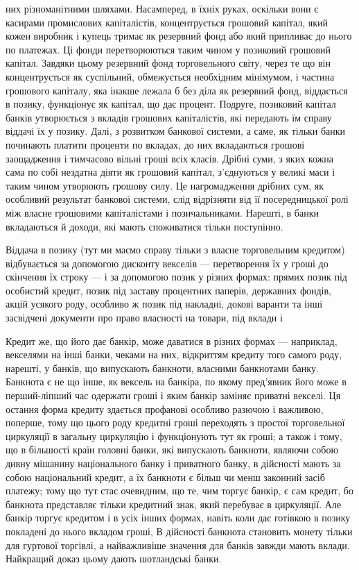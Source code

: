 \parcont{}  %
них різноманітними шляхами. Насамперед, в їхніх руках, оскільки
вони є касирами промислових капіталістів, концентрується грошовий
капітал, який кожен виробник і купець тримає як резервний
фонд або який припливає до нього по платежах. Ці
фонди перетворюються таким чином у позиковий грошовий
капітал. Завдяки цьому резервний фонд торговельного світу,
через те що він концентрується як суспільний, обмежується
необхідним мінімумом, і частина грошового капіталу, яка інакше
лежала б без діла як резервний фонд, віддається в позику,
функціонує як капітал, що дає процент. Подруге, позиковий
капітал банків утворюється з вкладів грошових капіталістів, які
передають їм справу віддачі їх у позику. Далі, з розвитком банкової
системи, а саме, як тільки банки починають платити проценти
по вкладах, до них вкладаються грошові заощадження
і тимчасово вільні гроші всіх класів. Дрібні суми, з яких кожна
сама по собі нездатна діяти як грошовий капітал, з’єднуються
у великі маси і таким чином утворюють грошову силу. Це нагромадження
дрібних сум, як особливий результат банкової системи,
слід відрізняти від її посередницької ролі між власне грошовими
капіталістами і позичальниками. Нарешті, в банки вкладаються
й доходи, які мають споживатися тільки поступінно.

Віддача в позику (тут ми маємо справу тільки з власне торговельним
кредитом) відбувається за допомогою дисконту векселів
— перетворення їх у гроші до скінчення їх строку — і за
допомогою позик у різних формах: прямих позик під особистий
кредит, позик під заставу процентних паперів, державних фондів,
акцій усякого роду, особливо ж позик під накладні, докові
варанти та інші засвідчені документи про право власності на
товари, під вклади і~

Кредит же, що його дає банкір, може даватися в різних формах
— наприклад, векселями на інші банки, чеками на них, відкриттям
кредиту того самого роду, нарешті, у банків, що випускають
банкноти, власними банкнотами банку. Банкнота є не
що інше, як вексель на банкіра, по якому пред’явник його може
в перший-ліпший час одержати гроші і яким банкір заміняє приватні
векселі. Ця остання форма кредиту здається профанові
особливо разючою і важливою, поперше, тому що цього роду
кредитні гроші переходять з простої торговельної циркуляції
в загальну циркуляцію і функціонують тут як гроші; а також
і тому, що в більшості країн головні банки, які випускають
банкноти, являючи собою дивну мішанину національного банку
і приватного банку, в дійсності мають за собою національний
кредит, а їх банкноти є більш чи менш законний засіб платежу;
тому що тут стає очевидним, що те, чим торгує банкір, є сам
кредит, бо банкнота представляє тільки кредитний знак, який перебуває
в циркуляції. Але банкір торгує кредитом і в усіх інших формах,
навіть коли дає готівкою в позику покладені до нього вкладом
гроші, В дійсності банкнота становить монету тільки для гуртової
торгівлі, а найважливіше значення для банків завжди мають вклади. Найкращий доказ цьому дають
шотландські банки.

